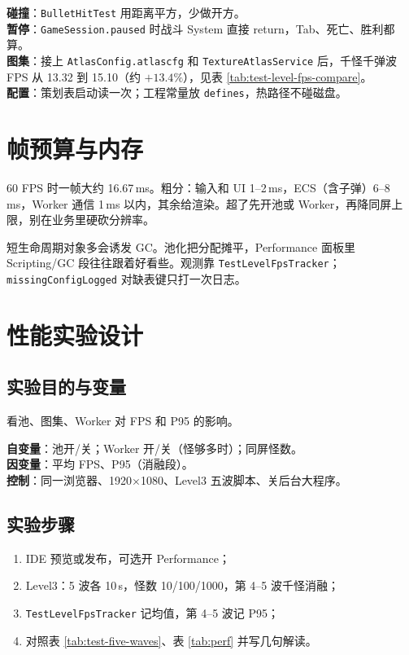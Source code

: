 \documentclass[UTF8,a4paper]{ctexart}
\begin{document}
\textbf{碰撞}：\texttt{BulletHitTest} 用距离平方，少做开方。\\
\textbf{暂停}：\texttt{GameSession.paused} 时战斗 System 直接 return，Tab、死亡、胜利都算。\\
\textbf{图集}：接上 \texttt{AtlasConfig.atlascfg} 和 \texttt{TextureAtlasService} 后，千怪千弹波 FPS 从 13.32 到 15.10（约 $+13.4\%$），见表 \ref{tab:test-level-fps-compare}。\\
\textbf{配置}：策划表启动读一次；工程常量放 \texttt{defines}，热路径不碰磁盘。

\section{帧预算与内存}

60 FPS 时一帧大约 16.67\,ms。粗分：输入和 UI 1--2\,ms，ECS（含子弹）6--8\,ms，Worker 通信 1\,ms 以内，其余给渲染\cite{gregory2018game}。超了先开池或 Worker，再降同屏上限，别在业务里硬砍分辨率。

短生命周期对象多会诱发 GC。池化把分配摊平，Performance 面板里 Scripting/GC 段往往跟着好看些。观测靠 \texttt{TestLevelFpsTracker}；\texttt{missingConfigLogged} 对缺表键只打一次日志。

\section{性能实验设计}

\subsection{实验目的与变量}

看池、图集、Worker 对 FPS 和 P95 的影响\cite{gregory2018game,mckenzie2008crowd}。

\textbf{自变量}：池开/关；Worker 开/关（怪够多时）；同屏怪数。\\
\textbf{因变量}：平均 FPS、P95（消融段）。\\
\textbf{控制}：同一浏览器、1920$\times$1080、Level3 五波脚本、关后台大程序。

\subsection{实验步骤}

\begin{enumerate}[label=\arabic*.]
  \item IDE 预览或发布，可选开 Performance；
  \item Level3：5 波各 10\,s，怪数 10/100/1000，第 4--5 波千怪消融；
  \item \texttt{TestLevelFpsTracker} 记均值，第 4--5 波记 P95；
  \item 对照表 \ref{tab:test-five-waves}、表 \ref{tab:perf} 并写几句解读。
\end{enumerate}
\end{document}
